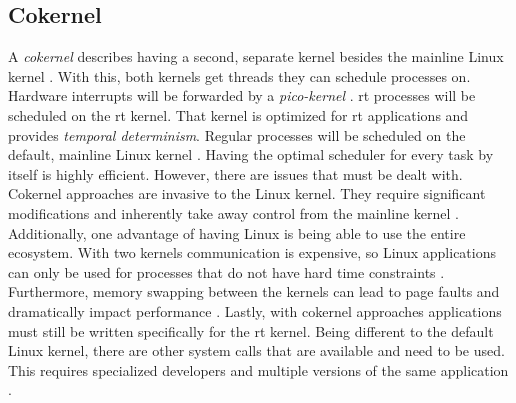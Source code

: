 \documentclass[10pt,twocolumn,a4paper]{article}
\begin{document}
\subsection{Cokernel}
A \emph{cokernel} describes having a second, separate kernel besides the mainline Linux kernel \cite{reghenzani_realtime_2019}.
With this, both kernels get threads they can schedule processes on.
Hardware interrupts will be forwarded by a \emph{pico-kernel} \cite{reghenzani_realtime_2019}.
\acrshort{rt} processes will be scheduled on the \acrshort{rt} kernel.
That kernel is optimized for \acrshort{rt} applications and provides \emph{temporal determinism}.
Regular processes will be scheduled on the default, mainline Linux kernel \cite{reghenzani_realtime_2019}.
Having the optimal scheduler for every task by itself is highly efficient.
However, there are issues that must be dealt with.
Cokernel approaches are invasive to the Linux kernel.
They require significant modifications and inherently take away control from the mainline kernel  \cite{reghenzani_realtime_2019}.
Additionally, one advantage of having Linux is being able to use the entire ecosystem.
With two kernels communication is expensive, so Linux applications can only be used for processes that do not have hard time constraints \cite{reghenzani_realtime_2019}.
Furthermore, memory swapping between the kernels can lead to page faults and dramatically impact performance \cite{reghenzani_realtime_2019}.
Lastly, with cokernel approaches applications must still be written specifically for the \acrshort{rt} kernel.
Being different to the default Linux kernel, there are other system calls that are available and need to be used.
This requires specialized developers and multiple versions of the same application \cite{reghenzani_realtime_2019}.
\end{document}

